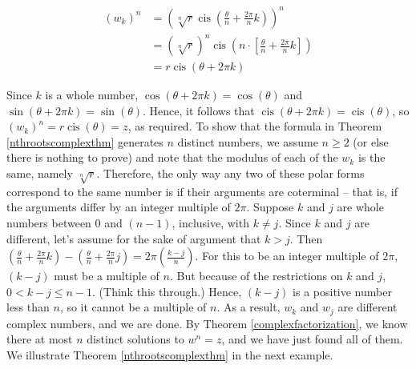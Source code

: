 \begin{align*}
\left(w_{k}\right)^n & =  \left(\sqrt[n]{r}\operatorname{cis}\left(\frac{\theta}{n} + \frac{2\pi}{n} k \right)\right)^n  \\ 																	 & =  \left(\sqrt[n]{r}\right)^{n} \operatorname{cis}\left( n \cdot \left[\frac{\theta}{n} + \frac{2\pi}{n} k \right] \right)  \tag*{DeMoivre's Theorem}\\ 													 & =  r \operatorname{cis}\left(\theta + 2\pi k\right)
\end{align*}
																	 
Since $k$ is a whole number, $\cos(\theta + 2\pi k) = \cos(\theta)$ and $\sin(\theta + 2\pi k) = \sin(\theta)$. Hence, it follows that $\operatorname{cis}(\theta + 2\pi k) = \operatorname{cis}(\theta)$, so $\left(w_{k}\right)^n = r \operatorname{cis}(\theta) = z$, as required.  To show that the formula in Theorem  \ref{nthrootscomplexthm} generates $n$ distinct numbers, we assume $n \geq 2$ (or else there is nothing to prove) and note that the modulus of each of the  $w_{k}$  is the same, namely $\sqrt[n]{r}$.  Therefore, the only way any two of these polar forms correspond to  the same number is if their arguments are coterminal -- that is, if the arguments differ by an integer multiple of $2\pi$. Suppose $k$ and $j$ are whole numbers between $0$ and $(n-1)$, inclusive,  with $k \neq j$.  Since $k$ and $j$ are different, let's assume for the sake of argument that  $k > j$.  Then $\left( \frac{\theta}{n} + \frac{2\pi}{n} k \right)  - \left( \frac{\theta}{n} + \frac{2\pi}{n} j \right) = 2\pi \left(\frac{k-j}{n}\right)$. For this to be an integer multiple of $2\pi$, $(k-j)$ must be a multiple of $n$.  But because of the restrictions on $k$ and $j$, $0 < k - j \leq n-1$. (Think this through.)  Hence, $(k-j)$ is a positive number less  than $n$, so it cannot be a multiple of $n$.  As a result, $w_{k}$ and $w_{j}$ are different complex numbers, and we are done.  By Theorem  \ref{complexfactorization}, we know there at most $n$ distinct solutions to $w^{n} = z$, and we have just found all of them.   We illustrate Theorem \ref{nthrootscomplexthm} in the next example.

\medskip

